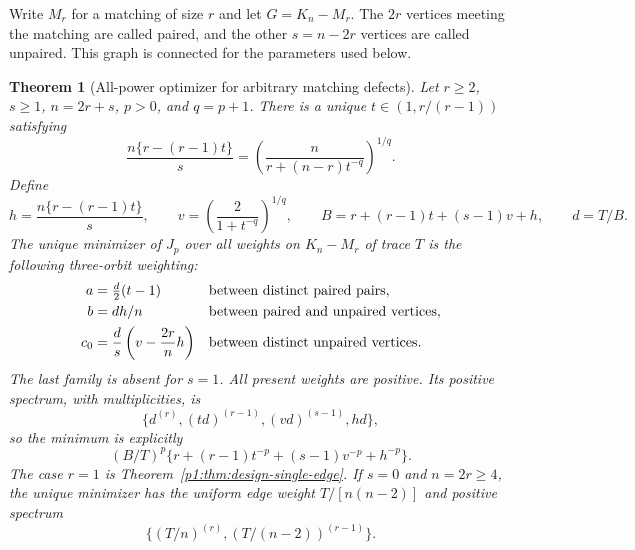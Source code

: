 \documentclass[11pt,a4paper]{article}
\newtheorem{theorem}{Theorem}[section]
\theoremstyle{definition}
\theoremstyle{remark}
\numberwithin{equation}{section}
\begin{document}
Write $M_r$ for a matching of size $r$ and let $G=K_n-M_r$.
The $2r$ vertices meeting the matching are called paired, and the other
$s=n-2r$ vertices are called unpaired.  This graph is connected for the
parameters used below.

\begin{theorem}[All-power optimizer for arbitrary matching defects]
\label{p1:thm:design-matching}
Let $r\ge2$, $s\ge1$, $n=2r+s$, $p>0$, and $q=p+1$.
There is a unique $t\in(1,r/(r-1))$ satisfying
\begin{equation}\label{p1:eq:design-matching-root}
 \frac{n\{r-(r-1)t\}}s
  =\left(\frac n{r+(n-r)t^{-q}}\right)^{1/q}.
\end{equation}
Define
\[
 h=\frac{n\{r-(r-1)t\}}s,\qquad
 v=\left(\frac2{1+t^{-q}}\right)^{1/q},\qquad
 B=r+(r-1)t+(s-1)v+h,\qquad d=T/B.
\]
The unique minimizer of $J_p$ over all weights on $K_n-M_r$ of trace
$T$ is the following three-orbit weighting:
\begin{align}
 a&=\tfrac d2(t-1)
 &&\text{between distinct paired pairs},\notag\\
 b&=dh/n
 &&\text{between paired and unpaired vertices},\label{p1:eq:design-matching-weights}\\
 c_0&=\frac ds\left(v-\frac{2r}n h\right)
 &&\text{between distinct unpaired vertices}.\notag
\end{align}
The last family is absent for $s=1$.  All present weights are positive.
Its positive spectrum, with multiplicities, is
\begin{equation}\label{p1:eq:design-matching-spectrum}
 \{d^{(r)},(td)^{(r-1)},(vd)^{(s-1)},hd\},
\end{equation}
so the minimum is explicitly
\begin{equation}\label{p1:eq:design-matching-value}
 (B/T)^p\{r+(r-1)t^{-p}+(s-1)v^{-p}+h^{-p}\}.
\end{equation}
The case $r=1$ is Theorem~\ref{p1:thm:design-single-edge}.
If $s=0$ and $n=2r\ge4$, the unique minimizer has the uniform edge
weight $T/[n(n-2)]$ and positive spectrum
\[
 \{(T/n)^{(r)},(T/(n-2))^{(r-1)}\}.
\]
\end{theorem}
\end{document}

